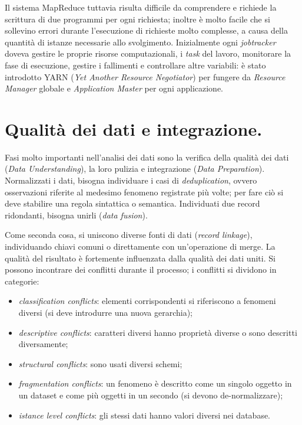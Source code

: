 \documentclass[a4page, 11pt]{article}
\begin{document}
Il sistema MapReduce tuttavia risulta difficile da comprendere e richiede la scrittura di due programmi per ogni richiesta; inoltre è molto facile che si sollevino errori durante l'esecuzione di richieste molto complesse, a causa della quantità di istanze necessarie allo svolgimento.
Inizialmente ogni \textit{jobtracker} doveva gestire le proprie risorse computazionali, i \textit{task} del lavoro, monitorare la fase di esecuzione, gestire i fallimenti e controllare altre variabili: è stato introdotto YARN (\textit{Yet Another Resource Negotiator}) per fungere da \textit{Resource Manager} globale e \textit{Application Master} per ogni applicazione.


\section{Qualità dei dati e integrazione.}
Fasi molto importanti nell'analisi dei dati sono la verifica della qualità dei dati (\textit{Data Understanding}), la loro pulizia e integrazione (\textit{Data Preparation}).
Normalizzati i dati, bisogna individuare i casi di \textit{deduplication}, ovvero osservazioni riferite al medesimo fenomeno registrate più volte; per fare ciò si deve stabilire una regola sintattica o semantica.
Individuati due record ridondanti, bisogna unirli (\textit{data fusion}).

Come seconda cosa, si uniscono diverse fonti di dati (\textit{record linkage}), individuando chiavi comuni o direttamente con un'operazione di merge.
La qualità del risultato è fortemente influenzata dalla qualità dei dati uniti.
Si possono incontrare dei conflitti durante il processo; i conflitti si dividono in categorie:
\begin{itemize}
\item \textit{classification conflicts}: elementi corrispondenti si riferiscono a fenomeni diversi (si deve introdurre una nuova gerarchia);
\item \textit{descriptive conflicts}: caratteri diversi hanno proprietà diverse o sono descritti diversamente;
\item \textit{structural conflicts}: sono usati diversi schemi;
\item \textit{fragmentation conflicts}: un fenomeno è descritto come un singolo oggetto in un dataset e come più oggetti in un secondo (si devono de-normalizzare);
\item \textit{istance level conflicts}: gli stessi dati hanno valori diversi nei database.
\end{itemize}
\end{document}
